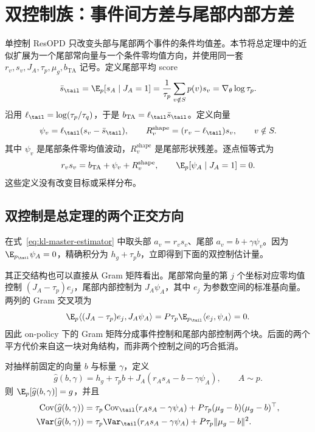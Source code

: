 \section{双控制族：事件间方差与尾部内部方差}
\label{sec:kl-two-controls}

单控制 ResOPD 只改变头部与尾部两个事件的条件均值差。本节将总定理中的近似扩展为一个尾部常向量与一个条件零均值方向，并使用同一套 $r_v,s_v,J_A,\tau_p,\mu_g,b_{\mathrm{TA}}$ 记号。定义尾部平均 score
\[
 \bar s_{\tail}=\E_p[s_A\mid J_A=1]
 =\frac{1}{\tau_p}\sum_{v\notin S}p(v)s_v
 =\nabla_\theta\log\tau_p.
\]
沿用 $\ell_{\tail}=\log(\tau_p/\tau_q)$，于是 $b_{\mathrm{TA}}=\ell_{\tail}\bar s_{\tail}$。定义向量
\[
 \psi_v=\ell_{\tail}(s_v-\bar s_{\tail}),\qquad
 R_v^{\mathrm{shape}}=(r_v-\ell_{\tail})s_v,\qquad v\notin S.
\]
其中 $\psi_v$ 是尾部条件零均值波动，$R_v^{\mathrm{shape}}$ 是尾部形状残差。逐点恒等式为
\begin{equation}
 r_vs_v=b_{\mathrm{TA}}+\psi_v+R_v^{\mathrm{shape}},\qquad
 \E_p[\psi_A\mid J_A=1]=0.
 \label{eq:kl-tail-fine-decomposition}
\end{equation}
这些定义没有改变目标或采样分布。

\subsection{双控制是总定理的两个正交方向}

在式~\eqref{eq:kl-master-estimator} 中取头部 $a_v=r_vs_v$、尾部 $a_v=b+\gamma\psi_v$。因为 $\E_{p_\tail}\psi_A=0$，精确积分为 $h_g+\tau_pb$，立即得到下面的双控制估计量。

其正交结构也可以直接从 Gram 矩阵看出。尾部常向量的第 $j$ 个坐标对应零均值控制 $(J_A-\tau_p)e_j$，尾部内部控制为 $J_A\psi_A$，其中 $e_j$ 为参数空间的标准基向量。两列的 Gram 交叉项为
\[
 \E_p\langle(J_A-\tau_p)e_j,J_A\psi_A\rangle
 =P\tau_p\E_{p_\tail}\langle e_j,\psi_A\rangle=0.
\]
因此 on-policy 下的 Gram 矩阵分成事件控制和尾部内部控制两个块。后面的两个平方代价来自这一块对角结构，而非两个控制之间的巧合抵消。

\begin{theorem}[双控制估计量及其精确协方差]
\label{thm:kl-two-controls}
对抽样前固定的向量 $b$ 与标量 $\gamma$，定义
\[
 \widehat g(b,\gamma)
 =h_g+\tau_pb+J_A(r_As_A-b-\gamma \psi_A),\qquad A\sim p.
\]
则 $\E_p[\widehat g(b,\gamma)]=g$，并且
\begin{align}
 \operatorname{Cov}(\widehat g(b,\gamma))
 &=\tau_p\operatorname{Cov}_{\tail}(r_As_A-\gamma \psi_A)
   +P\tau_p(\mu_g-b)(\mu_g-b)^\top, \label{eq:kl-two-control-cov}\\
 \Var(\widehat g(b,\gamma))
 &=\tau_p\Var_{\tail}(r_As_A-\gamma \psi_A)
   +P\tau_p\lVert\mu_g-b\rVert^2. \label{eq:kl-two-control-var}
\end{align}
\end{theorem}

